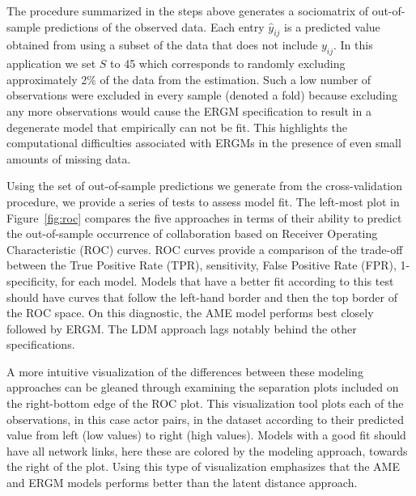 \documentclass[12pt,pdflatex]{elsarticle}
\begin{document}
The procedure summarized in the steps above generates a sociomatrix of out-of-sample predictions of the observed data. Each entry $\hat y_{ij}$ is a predicted value obtained from using a subset of the data that does not include $y_{ij}$. In this application we set $S$ to 45 which corresponds to randomly excluding approximately 2\% of the data from the estimation. Such a low number of observations were excluded in every sample (denoted a fold) because excluding any more observations would cause the ERGM specification to result in a degenerate model that empirically can not be fit. This highlights the computational difficulties associated with ERGMs in the presence of even small amounts of missing data.

Using the set of out-of-sample predictions we generate from the cross-validation procedure, we provide a series of tests to assess model fit. The left-most plot in Figure~\ref{fig:roc} compares the five approaches in terms of their ability to predict the out-of-sample occurrence of collaboration based on Receiver Operating Characteristic (ROC) curves. ROC curves provide a comparison of the trade-off between the True Positive Rate (TPR), sensitivity, False Positive Rate (FPR), 1-specificity, for each model. Models that have a better fit according to this test should have curves that follow the left-hand border and then the top border of the ROC space. On this diagnostic, the AME model performs best closely followed by ERGM. The LDM approach lags notably behind the other specifications. 

A more intuitive visualization of the differences between these modeling approaches can be gleaned through examining the separation plots included on the right-bottom edge of the ROC plot. This visualization tool plots each of the observations, in this case actor pairs, in the dataset according to their predicted value from left (low values) to right (high values). Models with a good fit should have all network links, here these are colored by the modeling approach, towards the right of the plot. Using this type of visualization emphasizes that the AME and ERGM models performs better than the latent distance approach.
\end{document}
